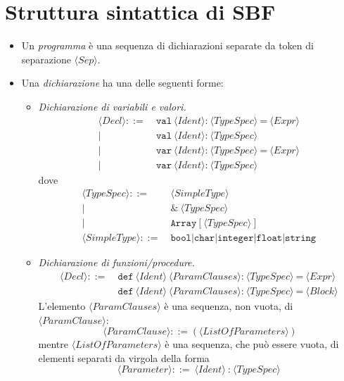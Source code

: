 \documentclass[11pt,a4paper,italian]{article}
\newcommand{\SBF}{\textbf{SBF}}
\newcommand{\token}[1]{\langle \mathit{#1} \rangle }
\begin{document}
	\section{Struttura sintattica di \SBF}
	\begin{itemize}
	\item Un \emph{programma} è una sequenza di dichiarazioni separate da token di separazione $\token{Sep}$.

	
	\item Una \emph{dichiarazione} ha una delle seguenti forme:
	\begin{itemize}
		\item \emph{Dichiarazione di variabili e valori.}
		\begin{align*}
		\token{Decl} ::=\ &\texttt{val}\ \token{Ident} \texttt{:}\ \token{TypeSpec}\ \texttt{=}\ \token{Expr}\\
		|\ &\texttt{val}\ \token{Ident} \texttt{:}\ \token{TypeSpec}\\
		|\ &\texttt{var}\ \token{Ident} \texttt{:}\ \token{TypeSpec}\ \texttt{=}\ \token{Expr}\\
		|\ &\texttt{var}\ \token{Ident} \texttt{:}\ \token{TypeSpec}
		\end{align*}
		dove
		\begin{align*}
		\token{TypeSpec} ::=\ &\token{SimpleType}\\
		|\ &\texttt{\&}\ \token{TypeSpec}\\
		|\ &\texttt{Array}\ \texttt{[}\ \token{TypeSpec}\ \texttt{]}\\
		\token{SimpleType} ::=\ &\texttt{bool}| \texttt{char}| \texttt{integer}| \texttt{float}| \texttt{string}
		\end{align*}
		\item \emph{Dichiarazione di funzioni/procedure.}
		\begin{align*}
		\token{Decl} ::=\ & \texttt{def}\ \token{Ident}\ \token{ParamClauses} \texttt{:}\ \token{TypeSpec}\ \texttt{=}\ \token{Expr}\\
		& \texttt{def}\ \token{Ident}\ \token{ParamClauses} \texttt{:}\ \token{TypeSpec}\ \texttt{=}\ \token{Block}
		\end{align*}
		L'elemento $\token{ParamClauses}$ è una sequenza, non vuota, di $\token{ParamClause}$:
		\begin{equation*}
		\token{ParamClause} ::=\ \texttt{(}\ \token{ListOfParameters}\ \texttt{)}
		\end{equation*}
		mentre $\token{ListOfParameters}$ è una sequenza, che può essere vuota, di elementi separati da virgola della forma
		\begin{equation*}
		\token{Parameter} ::=\ \token{Ident}\ \texttt{:}\ \token{TypeSpec}
		\end{equation*}
		

\end{itemize}
\end{itemize}
\end{document}
